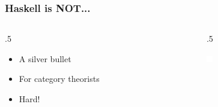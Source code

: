 \documentclass[17pt]{beamer}
\renewcommand{\(}[1]{\begin{columns}[#1]}
\renewcommand{\)}{\end{columns}}
\newcommand{\<}[1]{\begin{column}{#1}}
\renewcommand{\>}{\end{column}}
\begin{document}
\begin{frame}
  \frametitle{Haskell is NOT...}
  \({c}
  \<{.5\textwidth}
  \begin{center}
    \begin{itemize}
    \item A silver bullet
    \item For category theorists
    \item<2-> Hard! 
    \end{itemize}
  \end{center}
  \>
  \<{.5\textwidth}
  \begin{center}
    \includegraphics[width=\textwidth]{img/replace_me_with_anything_you_want}
  \end{center}
  \>
  \)
\end{frame}
\end{document}
